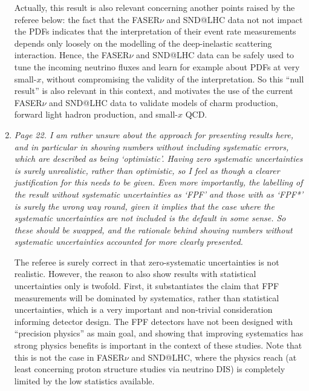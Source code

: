 \documentclass[11pt,a4paper]{article}
\begin{document}
\begin{enumerate}
        Actually, this result is also relevant concerning another points raised by the referee below:
        the fact that the FASER$\nu$ and SND@LHC data not not impact the PDFs indicates that the
        interpretation of their event rate measurements depends only loosely on the modelling
        of the deep-inelastic scattering interaction.
        Hence, the FASER$\nu$ and SND@LHC data can be safely used to tune the incoming neutrino fluxes
        and learn for example about PDFs at very small-$x$, without compromising
        the validity of the interpretation.
        So this ``null result'' is also relevant in this context, and motivates the use of the current
        FASER$\nu$ and SND@LHC data to validate models of charm production, forward light hadron
        production, and small-$x$ QCD.

        
	
	\item {\it Page 22. I am rather unsure about the approach for presenting results here, and in
		particular in showing numbers without including systematic errors, which are described
		as being ‘optimistic’. Having zero systematic uncertainties is surely unrealistic, rather
		than optimistic, so I feel as though a clearer justification for this needs to be given.
		Even more importantly, the labelling of the result without systematic uncertainties as
		‘FPF’ and those with as ‘FPF*’ is surely the wrong way round, given it implies that
		the case where the systematic uncertainties are not included is the default in some
		sense. So these should be swapped, and the rationale behind showing numbers without
		systematic uncertainties accounted for more clearly presented.
	}
	
	  The referee is surely correct in that zero-systematic uncertainties is not realistic.
          However,
	the reason to also show results with statistical uncertainties only is twofold. First, it
	substantiates the claim that FPF measurements will be dominated by systematics, rather
        than statistical uncertainties, which is a very important and non-trivial consideration
        informing detector design. The FPF detectors have not been designed with ``precision physics'' as main
        goal, and showing that improving systematics has strong physics benefits is important
        in the context of these studies.
        Note that this is not the case in FASER$\nu$ and SND@LHC, where the physics reach
        (at least concerning proton structure studies via neutrino DIS) is completely
        limited by the low statistics available.


\end{enumerate}
\end{document}
